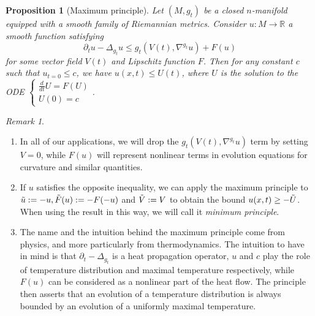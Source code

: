 \documentclass{article}
\theoremstyle{plain}
\newtheorem{prop}{Proposition}[section]
\theoremstyle{remark}
\newtheorem*{rem}{Remark}
\theoremstyle{definition}
\begin{document}
\begin{prop}[Maximum principle]\label{maxprinc}
    Let $(M, g_t)$ be a closed $n$-manifold equipped with a smooth family of Riemannian metrics. Consider $u:M \to \mathbb{R}$ a smooth function satisfying 
    $$\partial_tu - \Delta_{g_t}u \leq g_t(V(t), \nabla^{g_t}u)+F(u)$$
    for some vector field $V(t)$ and Lipschitz function $F$. Then for any constant $c$ such that $u_{t=0} \leq c$, we have $u(x,t)\leq U(t)$, where $U$ is the solution to the ODE $\begin{cases}
        \frac{d}{dt}U=F(U)\\ U(0)=c
    \end{cases}$.
\end{prop}
\begin{rem}
    \begin{enumerate}
        \item In all of our applications, we will drop the $g_t(V(t), \nabla^{g_t}u)$ term by setting $V=0$, while $F(u)$ will represent nonlinear terms in evolution equations for curvature and similar quantities.
        \item If $u$ satisfies the opposite inequality, we can apply the maximum principle to $\Tilde{u}:=-u, \Tilde{F}(u):=-F(-u)$ and $\Tilde{V}:=V$ to obtain the bound $u(x,t) \geq -\Tilde{U}$. When using the result in this way, we will call it \emph{minimum principle}.
        \item The name and the intuition behind the maximum principle come from physics, and more particularly from thermodynamics. The intuition to have in mind is that $\partial_t - \Delta_{g_t}$ is a heat propagation operator, $u$ and $c$ play the role of temperature distribution and maximal temperature respectively, while $F(u)$ can be considered as a nonlinear part of the heat flow. The principle then asserts that an evolution of a temperature distribution is always bounded by an evolution of a uniformly maximal temperature.
    \end{enumerate}
\end{rem}
\end{document}
